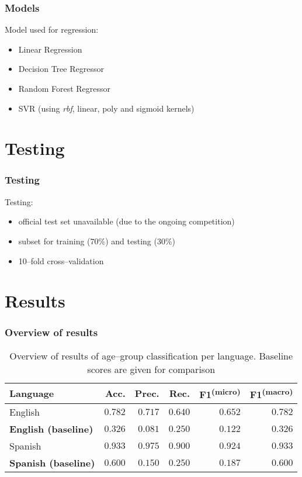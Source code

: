 \documentclass[utf8]{beamer}
\begin{document}
\begin{frame}
	\frametitle{Models}
	Model used for regression:
	\pause
	\begin{itemize}
		\item Linear Regression
		\item Decision Tree Regressor
		\item Random Forest Regressor
		\item SVR (using \textit{rbf}, linear, poly and sigmoid kernels)
	\end{itemize}
\end{frame}

\section{Testing}
\begin{frame}
	\frametitle{Testing}
	Testing:
	\pause
	\begin{itemize}
		\item official test set unavailable (due to the ongoing competition)
		\item subset for training (70\%) and testing (30\%)
		\item 10–fold cross–validation
	\end{itemize}
\end{frame}
\section{Results}

\begin{frame}
	\frametitle{Overview of results}
	\begin{table}
		\caption{Overview of results of age--group classification per language. Baseline scores are given for comparison}
		\label{tab:scores-age}
		\begin{center}
			\begin{tabular}{l|rrrrr}
				\toprule
				Language & Acc. & Prec. & Rec. & F1\textsuperscript{(micro)} & F1\textsuperscript{(macro)} \\
				\midrule
				English & $ 0.782 $ & $ 0.717 $ & $ 0.640 $ & $ 0.652 $ & $ 0.782 $ \\
				\textbf{English (baseline)} &$ 0.326 $ & $ 0.081 $ & $ 0.250 $ & $ 0.122 $ & $ 0.326 $ \\
				Spanish & $ 0.933 $ & $ 0.975 $ & $  0.900 $ & $ 0.924 $ & $ 0.933 $ \\
				\textbf{Spanish (baseline)} & $  0.600 $ & $  0.150 $ & $  0.250 $ & $ 0.187 $ & $  0.600 $ \\
				\bottomrule
			\end{tabular}
		\end{center}
	\end{table}
\end{frame}
\end{document}
